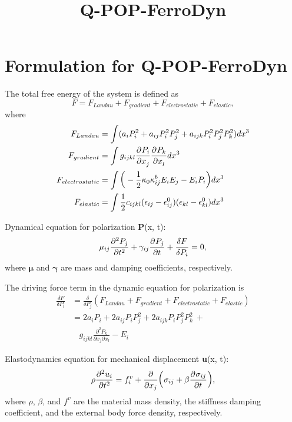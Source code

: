\documentclass[]{article}
\title{Q-POP-FerroDyn}
\begin{document}
	
	\maketitle
	\section*{Formulation for Q-POP-FerroDyn}

		The total free energy of the system is defined as 
		\begin{equation}
			F = F_{Landau} + F_{gradient} + F_{electrostatic} + F_{elastic},
		\end{equation}
		where
		\begin{align}
			F_{Landau} & = \int(a_{i}P_{i}^{2} + a_{ij}P_{i}^{2}P_{j}^{2} + a_{ijk}P_{i}^{2}P_{j}^{2}P_{k}^{2})dx^{3} \\
			F_{gradient} & = \int g_{ijkl}\pdv[]{P_{i}}{x_{j}}\pdv[]{P_{k}}{x_{l}}dx^{3} \\
			F_{electrostatic} & = \int\bigg(-\frac{1}{2}\kappa_{0}\kappa_{ij}^{b}E_{i}E_{j} - E_{i}P_{i}\bigg)dx^{3}\\
			F_{elastic} & = \int\frac{1}{2}c_{ijkl}(\epsilon_{ij}-\epsilon_{ij}^{0})(\epsilon_{kl}-\epsilon_{kl}^{0})dx^{3}
		\end{align}

		Dynamical equation for polarization \textbf{P}(x, t):
		\begin{equation}
			\mu_{ij}\pdv[2]{P_{j}}{t} + \gamma_{ij}\pdv[]{P_{j}}{t} + \frac{\delta F}{\delta P_{i}} = 0,
		\end{equation}
		where $\bm{\mu}$ and $\bm{\gamma}$ are mass and damping coefficients, respectively. 
		

		The driving force term in the dynamic equation for polarization is
		\begin{align}
			\frac{\delta F}{\delta P_{i}} & = \frac{\delta}{\delta P_{j}}(F_{Landau} + F_{gradient} + F_{electrostatic} + F_{elastic}) \\
			& = 2a_{i}P_{i} + 2a_{ij}P_{i}P_{j}^{2} + 2a_{ijk}P_{i}P_{j}^{2}P_{k}^{2}\ +\nonumber \\
			& \ \ \ \ g_{ijkl}\frac{\partial^{2}P_{k}}{\partial x_{j}\partial x_{l}} - E_{i}
		\end{align}

		Elastodynamics equation for mechanical displacement \textbf{u}(x, t):
		\begin{equation}
			\rho\pdv[2]{u_{i}}{t} = f^{v}_{i} + \frac{\partial}{\partial x_{j}}\bigg(\sigma_{ij} + \beta\pdv[]{\sigma_{ij}}{t}\bigg),
		\end{equation}
		where $\rho$, $\beta$, and \textbf{$f^{v}$} are the material mass density, the stiffness damping coefficient, and the external body force density, respectively. 
		
\end{document}

